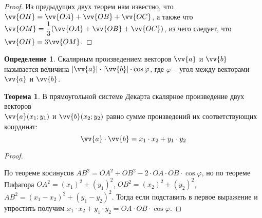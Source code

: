 \documentclass[12pt]{article}
\theoremstyle{definition}
\newtheorem{theorem}{Теорема}[section]
\newtheorem{definition}{Определение}
\begin{document}
    \begin{proof}
        Из предыдущих двух теорем нам известно, что $\vv{OH}=\vv{OA}+\vv{OB}+\vv{OC}$, а также что $\vv{OM}=\dfrac{1}{3}(\vv{OA}+\vv{OB}+\vv{OC})$, из чего следует, что $\vv{OH}=3\vv{OM}$.
    \end{proof}

\begin{definition}
    Скалярным произведением векторов $\vv{a}$ и $\vv{b}$ называется величина $|\vv{a}|\cdot |\vv{b}|\cdot \cos \varphi$, где $\varphi$ -- угол между векторами $\vv{a}$ и $\vv{b}$.
\end{definition}

\begin{theorem}
    В прямоугольной системе Декарта скалярное произведение двух векторов\\ $\vv{a}(x_1;y_1)$ и $\vv{b}(x_2;y_2)$ равно сумме произведений их соответствующих координат: 
    $$\vv{a}\cdot \vv{b}=x_1\cdot x_2 + y_1\cdot y_2$$
\end{theorem}
    \begin{proof}
    $ $\par\nobreak\ignorespaces
    \begin{center}
    \end{center}
        По теореме косинусов $AB^2=OA^2+OB^2-2\cdot OA\cdot OB \cdot \cos \varphi$, но по теореме Пифагора $OA^2=(x_1)^2+(y_1)^2$, $OB^2=(x_2)^2+(y_2)^2$, $AB^2=(x_1-x_2)^2+(y_1-y_2)^2$. Тогда если подставить в первое выражение и упростить получим $x_1\cdot x_2 + y_1\cdot y_2=OA\cdot OB\cdot \cos \varphi$.
    \end{proof}
\end{document}
